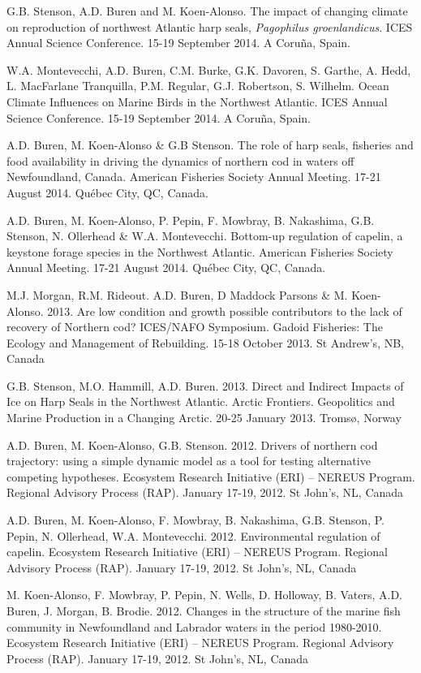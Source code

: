 \documentclass{res}
\begin{document}
\begin{resume}
\begin{hangparas}{.4in}{1}
G.B. Stenson, A.D. Buren and M. Koen-Alonso. The impact of changing climate on reproduction of northwest Atlantic harp seals, \textit{Pagophilus groenlandicus}. ICES Annual Science Conference. 15-19 September 2014. A Coru\~{n}a, Spain.

W.A. Montevecchi, A.D. Buren, C.M. Burke, G.K. Davoren, S. Garthe, A. Hedd, L. MacFarlane Tranquilla, P.M. Regular, G.J. Robertson, S. Wilhelm. Ocean Climate Influences on Marine Birds in the Northwest Atlantic. ICES Annual Science Conference. 15-19 September 2014. A Coru\~{n}a, Spain.

A.D. Buren, M. Koen-Alonso \& G.B Stenson. The role of harp seals, fisheries and food availability in driving the dynamics of northern cod in waters off Newfoundland, Canada. American Fisheries Society Annual Meeting. 17-21 August 2014. Qu\'{e}bec City, QC, Canada.

A.D. Buren, M. Koen-Alonso, P. Pepin, F. Mowbray, B. Nakashima, G.B. Stenson, N. Ollerhead \& W.A. Montevecchi. Bottom-up regulation of capelin, a keystone forage species in the Northwest Atlantic. American Fisheries Society Annual Meeting. 17-21 August 2014. Qu\'{e}bec City, QC, Canada.

M.J. Morgan, R.M. Rideout. A.D. Buren, D Maddock Parsons \& M. Koen-Alonso. 2013. Are low condition and growth possible contributors to the lack of recovery of Northern cod? ICES/NAFO Symposium. Gadoid Fisheries: The Ecology and Management of Rebuilding. 15-18 October 2013. St Andrew's, NB, Canada

G.B. Stenson, M.O. Hammill, A.D. Buren. 2013. Direct and Indirect Impacts of Ice on Harp Seals in the Northwest Atlantic. Arctic Frontiers. Geopolitics and Marine Production in a Changing Arctic. 20-25 January 2013. Troms{\o}, Norway

A.D. Buren, M. Koen-Alonso, G.B. Stenson. 2012. Drivers of northern cod trajectory: using a simple dynamic model as a tool for testing alternative competing hypotheses. Ecosystem Research Initiative (ERI) – NEREUS Program. Regional Advisory Process (RAP). January 17-19, 2012. St John's, NL, Canada

A.D. Buren, M. Koen-Alonso, F. Mowbray, B. Nakashima, G.B. Stenson, P. Pepin, N. Ollerhead, W.A. Montevecchi. 2012. Environmental regulation of capelin. Ecosystem Research Initiative (ERI) – NEREUS Program. Regional Advisory Process (RAP). January 17-19, 2012. St John's, NL, Canada

M. Koen-Alonso, F. Mowbray, P. Pepin, N. Wells, D. Holloway, B. Vaters, A.D. Buren, J. Morgan, B. Brodie. 2012. Changes in the structure of the marine fish community in Newfoundland and Labrador waters in the period 1980-2010. Ecosystem Research Initiative (ERI) – NEREUS Program. Regional Advisory Process (RAP). January 17-19, 2012. St John's, NL, Canada


\end{hangparas}
\end{resume}
\end{document}
